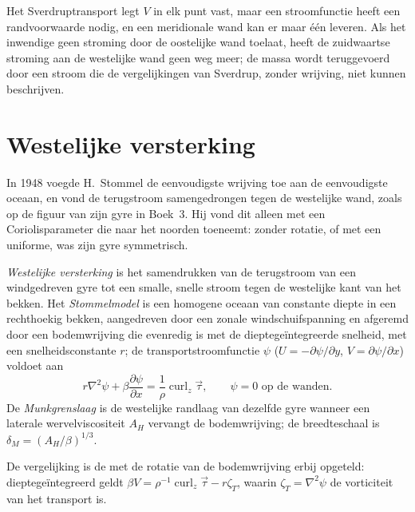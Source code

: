 Het Sverdruptransport legt $V$ in elk punt vast, maar een stroomfunctie
heeft een randvoorwaarde nodig, en een meridionale wand kan er maar één leveren. Als het
inwendige geen stroming door de oostelijke wand toelaat, heeft de zuidwaartse stroming
aan de westelijke wand geen weg meer; de massa wordt teruggevoerd door een stroom
die de vergelijkingen van Sverdrup, zonder wrijving, niet kunnen beschrijven.

\section{Westelijke versterking}\label{sec:b3:ocean-dynamics:western}

In 1948 voegde H.~Stommel de eenvoudigste wrijving toe aan de eenvoudigste oceaan, en
vond de terugstroom samengedrongen tegen de westelijke wand, zoals op de
figuur van zijn gyre in Boek~3. Hij vond dit alleen met een
Coriolisparameter die naar het noorden toeneemt: zonder rotatie, of met een uniforme,
was zijn gyre symmetrisch.

\begin{definition}\label{def:b3:ocean-dynamics:western-intensification}
\emph{Westelijke versterking} is het
samendrukken van de terugstroom van een windgedreven gyre tot een smalle, snelle
stroom tegen de westelijke kant van het bekken. Het
\emph{Stommelmodel} is een homogene oceaan van constante diepte in een
rechthoekig bekken, aangedreven door een zonale windschuifspanning en afgeremd door een
bodemwrijving die evenredig is met de dieptegeïntegreerde snelheid, met een snelheidsconstante $r$;
de transportstroomfunctie $\psi$ ($U = -\partial\psi/\partial y$, $V =
\partial\psi/\partial x$) voldoet aan
\[
r\nabla^2\psi + \beta\frac{\partial\psi}{\partial x} =
\frac{1}{\rho}\operatorname{curl}_z\vec\tau ,\qquad \psi = 0 \text{ op de wanden.}
\]
De \emph{Munkgrenslaag} is de westelijke
randlaag van dezelfde gyre wanneer een laterale wervelviscositeit $A_H$
vervangt de bodemwrijving; de breedteschaal is $\delta_M =
(A_H/\beta)^{1/3}$.
\end{definition}

De vergelijking is de  met de rotatie van de bodemwrijving
erbij opgeteld: dieptegeïntegreerd geldt $\beta V = \rho^{-1}\operatorname{curl}_z
\vec\tau - r\zeta_T$, waarin $\zeta_T = \nabla^2\psi$ de vorticiteit van
het transport is.

